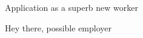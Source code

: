 
\opening{		
	\large{Application as a superb new worker} \normalsize 
}


\makelettertitle\justifying
Hey there, possible employer